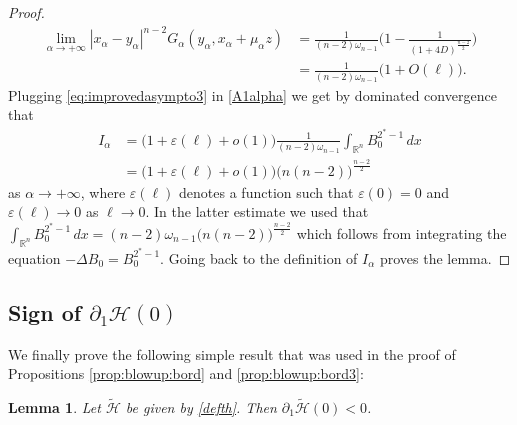 \documentclass[10pt]{amsart}
\numberwithin{equation}{section}
\newcommand{\R}{\mathbb{R}}
\newcommand{\ve}{\varepsilon}
\newcommand{\ma}{\mu_\alpha}
\def\la{\alpha}
\def \ma{\mu_{\alpha}}
\def \h{\mathcal{H}}
\def \th{\widetilde{\mathcal{H}}}
\def \lal{\lim_{\alpha\to +\infty}}
\theoremstyle{plain}
\newtheorem{lemme}{Lemma}[section]%
\theoremstyle{remark}
\begin{document}
\begin{proof}
\begin{equation} \label{eq:improvedasympto3}
\begin{aligned}
	  \lal |x_\alpha - y_\alpha|^{n-2}G_{\la}(y_\alpha, x_\alpha + \ma z) 
& =\frac{1}{(n-2)\omega_{n-1}} \Big( 1 - \frac{1}{(1+4D)^{\frac{n-2}{2}}} \Big) \\
& = \frac{1}{(n-2)\omega_{n-1}}\big( 1 + O(\ell) \big).
\end{aligned}
\end{equation}
Plugging \eqref{eq:improvedasympto3} in \eqref{A1alpha} we get by dominated convergence that 
$$ \begin{aligned}
 I_{\alpha} & = \big( 1 + \ve(\ell) + o(1) \big)  \frac{1}{(n-2) \omega_{n-1}} \int_{\R^n} B_0^{2^*-1} \, dx  \\
 & = \big( 1 + \ve(\ell) + o(1) \big) \big(n(n-2)\big)^{\frac{n-2}{2}}
 \end{aligned} $$
 as $\alpha \to + \infty$, where $\ve(\ell)$ denotes a function such that $\ve(0) = 0$ and $\ve(\ell) \to 0$ as $\ell \to 0$. In the latter estimate we used that 
 $\int_{\R^n}B_0^{2^*-1} \, dx = (n-2) \omega_{n-1} \big( n(n-2)\big)^{\frac{n-2}{2}}$ which follows from integrating the equation $- \Delta B_0 = B_0^{2^*-1}$. Going back to the definition of $I_\alpha$ proves the lemma. 
  \end{proof}
  
  \subsection{Sign of $\partial_1 \h(0)$}
  
  We finally prove the following simple result that was used in the proof of Propositions \ref{prop:blowup:bord} and \ref{prop:blowup:bord3}:
  
  \begin{lemme} \label{h0negatif}
Let $\th$ be given by \eqref{defth}. Then $\partial_1 \th(0) < 0$.
  \end{lemme}
\end{document}
